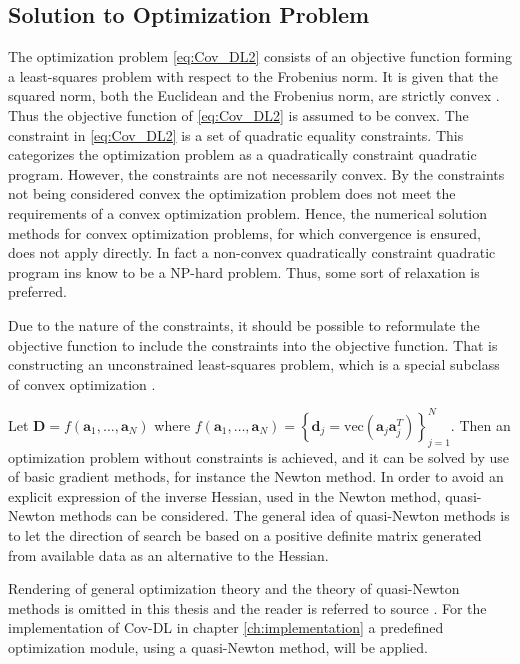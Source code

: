 \subsection{Solution to Optimization Problem}
The optimization problem \eqref{eq:Cov_DL2} consists of an objective function forming a least-squares problem with respect to the Frobenius norm. It is given that the squared norm, both the Euclidean and the Frobenius norm, are strictly convex \cite[p.173]{norm_optimization}.
Thus the objective function of \eqref{eq:Cov_DL2} is assumed to be convex.
The constraint in \eqref{eq:Cov_DL2} is a set of quadratic equality constraints. 
This categorizes the optimization problem as a quadratically constraint quadratic program. 
However, the constraints are not necessarily convex. 
By the constraints not being considered convex the optimization problem does not meet the requirements of a convex optimization problem. Hence, the numerical solution methods for convex optimization problems, for which convergence is ensured, does not apply directly. In fact a non-convex quadratically constraint quadratic program ins know to be a NP-hard problem\cite{qcqp}. Thus, some sort of relaxation is preferred.  

Due to the nature of the constraints, it should be possible to reformulate the objective function to include the constraints into the objective function. That is constructing an unconstrained least-squares problem, which is a special subclass of convex optimization \cite{cvxbook}.

Let $\mathbf{D} = f\left(\mathbf{a}_1, \dots, \mathbf{a}_N\right)$ where $f\left(\mathbf{a}_1, \dots, \mathbf{a}_N\right) = \left\{\mathbf{d}_j = \text{vec}\left(\mathbf{a}_j \mathbf{a}_j^T\right) \right\}_{j=1}^{N}$. 
Then an optimization problem without constraints is achieved, and it can be solved by use of basic gradient methods, for instance the Newton method. In order to avoid an explicit expression of the inverse Hessian, used in the Newton method, quasi-Newton methods can be considered\cite{Optimization2007}. 
The general idea of quasi-Newton methods is to let the direction of search be based on a positive definite matrix generated from available data as an alternative to the Hessian. 

Rendering of general optimization theory and the theory of quasi-Newton methods is omitted in this thesis and the reader is referred to source \cite{Optimization2007}.
For the implementation of Cov-DL in chapter \ref{ch:implementation} a predefined optimization module, using a quasi-Newton method, will be applied.   
   

